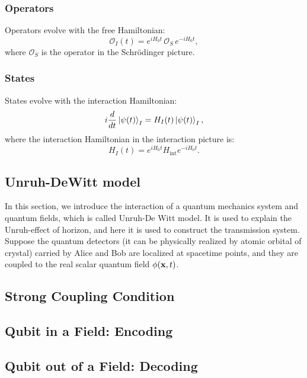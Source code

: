 \documentclass[a4paper,12pt]{article}
\begin{document}
\subsubsection*{Operators}

Operators evolve with the free Hamiltonian:
\begin{equation}
\mathcal{O}_I(t) = e^{i H_0 t} \, \mathcal{O}_S \, e^{-i H_0 t},
\end{equation}
where $\mathcal{O}_S$ is the operator in the Schrödinger picture.

\subsubsection*{States}

States evolve with the interaction Hamiltonian:
\begin{equation}
i \frac{d}{dt} \ket{\psi(t)}_I = H_I(t) \ket{\psi(t)}_I,
\end{equation}
where the interaction Hamiltonian in the interaction picture is:
\begin{equation}
H_I(t) = e^{i H_0 t} H_{\text{int}} e^{-i H_0 t}.
\end{equation}

\subsection*{Unruh-DeWitt model}
In this section, we introduce the interaction of a quantum mechanics system and quantum fields, which is called Unruh-De Witt model.
It is used to explain the Unruh-effect of horizon, and here it is used to construct the transmission system.
Suppose the quantum detectors (it can be physically realized by atomic orbital of crystal) carried by Alice and Bob are localized at spacetime points, and they are coupled to the real scalar quantum field $\phi( \mathbf x, t )$.
\subsection*{Strong Coupling Condition}

\subsection*{Qubit in a Field: Encoding}

\subsection*{Qubit out of a Field: Decoding}
\end{document}
